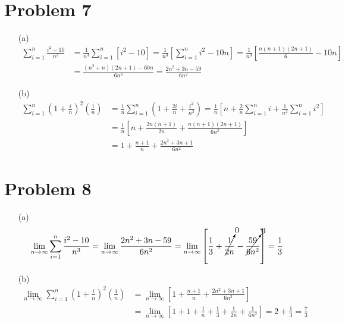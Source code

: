 \documentclass[preview, margin=0.6in]{standalone}
\newcommand*{\problem}[1]{\section*{Problem #1}}
\begin{document}
\problem{7}
\begin{itemize}
	\item[(a)]
		\begin{align*}
			\sum_{i=1}^{n}\frac{i^2-10}{n^3}
			&=\frac{1}{n^3}\sum_{i=1}^{n}\left[i^2-10\right]
			=\frac{1}{n^3}\left[\sum_{i=1}^{n}i^2-10n\right]
			=\frac{1}{n^3}\left[\frac{n(n+1)(2n+1)}{6}-10n\right] \\ 
			&=\frac{\left(n^2+n\right)(2n+1)-60n}{6n^3}
			=\frac{2n^{2}+3n-59}{6n^2}
		\end{align*}
	\item[(b)]
		\begin{align*}
		    \sum_{i=1}^{n}\left(1+\frac in\right)^2\left(\frac1n\right)
			&=\frac1n \sum_{i=1}^{n}\left(1+\frac{2i}{n}+\frac{i^2}{n^2}\right)
			=\frac1n\left[n+\frac2n \sum_{i=1}^{n}i+\frac{1}{n^2}\sum_{i=1}^{n}i^2\right] \\ 
			&=\frac1n \left[n+\frac{2n(n+1)}{2n}+\frac{n(n+1)(2n+1)}{6n^2}\right] \\
			&=1+\frac{n+1}{n}+\frac{2n^2+3n+1}{6n^2}
		\end{align*}
\end{itemize}

\problem{8}
\begin{itemize}
	\item[(a)]
		\begin{align*}
			\lim_{n\to\infty}\sum_{i=1}^{n}\frac{i^2-10}{n^3}
			&=\lim_{n\to\infty}\frac{2n^2+3n-59}{6n^2}
			=\lim_{n\to\infty}\left[\frac13+\cancelto{0}{\frac{1}{2n}}-\cancelto{0}{\frac{59}{6n^2}}\right]
			=\frac13
		\end{align*}
	\item[(b)]
		\begin{align*}
		    \lim_{n\to\infty}\sum_{i=1}^{n}\left(1+\frac in\right)^2\left(\frac1n\right)
			&=\lim_{n\to\infty}\left[1+\frac{n+1}{n}+\frac{2n^2+3n+1}{6n^2}\right] \\
			&=\lim_{n\to\infty}\left[1+1+\frac1n+\frac13+\frac{1}{2n}+\frac{1}{6n^2}\right]
			=2+\frac13
			=\frac73
		\end{align*}
\end{itemize}
\end{document}
